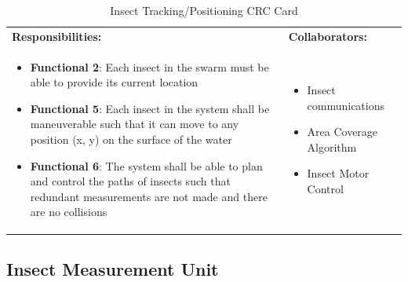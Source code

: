\documentclass[11pt]{article}
\begin{document}
\begin{table}[H]
\centering
\label{my-label}
\begin{tabular}{ | >{\raggedright\arraybackslash}p{} | >{\raggedright\arraybackslash}p{} | }
\hline
\multicolumn{2}{|c|}{\textbf{Hydroswarm}}             \\ \hline
\textbf{Responsibilities:} & \textbf{Collaborators:} \\ \hline
\begin{itemize}
\item \textbf{Functional 2}: Each insect in the swarm must be able to provide its current location
\item \textbf{Functional 5}: Each insect in the system shall be maneuverable such that it
can move to any position (x, y) on the surface of the water
\item \textbf{Functional 6}: The system shall be able to plan and control the paths of insects
such that redundant measurements are not made and there are no collisions
\end{itemize}
&
\begin{itemize} \item Insect communications
\item Area Coverage Algorithm
\item Insect Motor Control
\end{itemize} \\ \hline
\end{tabular}
\caption{Insect Tracking/Positioning CRC Card}
\end{table}

\subsection{Insect Measurement Unit}
\end{document}
